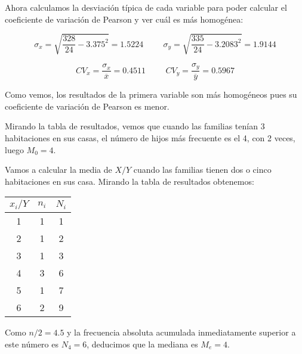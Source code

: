 Ahora calculamos la desviación típica de cada variable para poder calcular el coeficiente de variación de Pearson y ver cuál es más homogénea:

\begin{equation*}
    \sigma_{x} = \sqrt{\dfrac{328}{24}-3.375^2} = 1.5224
    \hspace{1cm}
    \sigma_{y} = \sqrt{\dfrac{335}{24}-3.2083^2} = 1.9144
\end{equation*}

\begin{equation*}
    CV_{x} = \dfrac{\sigma_x}{\overline{x}} = 0.4511
    \hspace{1cm}
    CV_{y} = \dfrac{\sigma_y}{\overline{y}} = 0.5967
\end{equation*}

Como vemos, los resultados de la primera variable son más homogéneos pues su coeficiente de variación de Pearson es menor.

\subproblem
Mirando la tabla de resultados, vemos que cuando las familias tenían 3 habitaciones en sus casas, el número de hijos más frecuente es el 4, con 2 veces, luego $M_0=4$.

\subproblem
Vamos a calcular la media de $X/Y$ cuando las familias tienen dos o cinco habitaciones en sus casa. Mirando la tabla de resultados obtenemos:

\begin{table}[ht]
    \begin{tabular}{|c|c|c|}
        \hline
         $x_i/Y$ & $n_{i}$ & $N_{i}$ \\ \hline
         1 & 1 & 1 \\ \hline 
         2 & 1 & 2 \\ \hline 
         3 & 1 & 3 \\ \hline 
         4 & 3 & 6 \\ \hline 
         5 & 1 & 7 \\ \hline  
         6 & 2 & 9 \\ \hline 
    \end{tabular}
\end{table}

Como $n/2 = 4.5$ y la frecuencia absoluta acumulada inmediatamente superior a este número es $N_{4} = 6$, deducimos que la mediana es $M_e = 4$.
